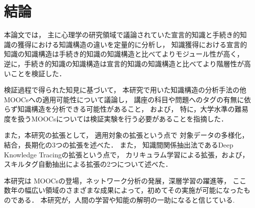 \chapter{結論}
\label{chap:conlusion}
\fancyhf{}
\rhead{\thepage}
\cfoot{\thepage}


本論文では，
主に心理学の研究領域で議論されていた宣言的知識と手続き的知識の獲得における知識構造の違いを定量的に分析し，
知識獲得における宣言的知識の知識構造は手続き的知識の知識構造と比べてよりモジュール性が高く，
逆に，手続き的知識の知識構造は宣言的知識の知識構造と比べてより階層性が高いことを検証した．
\vvspace

検証過程で得られた知見に基づいて，
本研究で用いた知識構造の分析手法の他MOOCsへの適用可能性について議論し，
講座の科目や問題へのタグの有無に依らず知識構造を分析できる可能性があること，
および，
特に，大学水準の難易度を扱うMOOCsについては検証実験を行う必要があることを指摘した．
\vvspace

また，本研究の拡張として，
適用対象の拡張という点で
対象データの多様化，結合，長期化の3つの拡張を述べた．
また，
知識間関係抽出法であるDeep Knowledge Tracingの拡張という点で，
カリキュラム学習による拡張，および，
スキルタグ自動抽出による拡張の2つについて述べた．
\vvspace


本研究は
MOOCsの登場，ネットワーク分析の発展，深層学習の躍進等，
ここ数年の幅広い領域のさまざまな成果によって，初めてその実施が可能になったものである．
本研究が，人間の学習や知能の解明の一助になると信じている.






